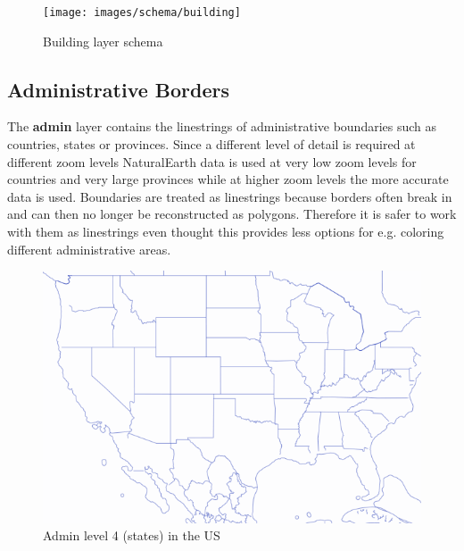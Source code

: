 \begin{figure}[H]
  \centering
  \texttt{[image: images/schema/building]}
  \caption{Building layer schema}
\end{figure}

\subsection{Administrative Borders}

\noindent\begin{minipage}[t]{0.48\linewidth}
    \vspace{0pt}
    The \textbf{admin} layer contains the linestrings of administrative boundaries such as countries, states or provinces. Since a different level of detail is required at different zoom levels NaturalEarth data is used at very low zoom levels for countries and very large provinces while at higher zoom levels the more accurate \osm{} data is used. Boundaries are treated as linestrings because borders often break in \osm{} and can then no longer be reconstructed as polygons. Therefore it is safer to work with them as linestrings even thought this provides less options for e.g. coloring different administrative areas.
\end{minipage}
\hfill
\begin{minipage}[t]{0.48\linewidth}
    \vspace{-20pt}
    \begin{figure}[H]
      \includegraphics[width=1\textwidth]{images/schema/admin_example}
      \caption{Admin level 4 (states) in the US}
    \end{figure}
\end{minipage}

